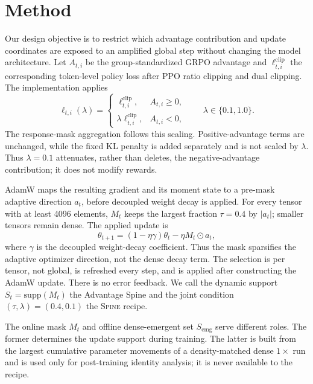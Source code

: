 \documentclass[5p,times]{elsarticle}
\newcommand{\recipe}{\textsc{Spine}}
\newcommand{\Semg}{S_{\mathrm{emg}}}
\newcommand{\St}{S_t}
\begin{document}
\section{Method}\label{sec:method}
Our design objective is to restrict which advantage contribution and update
coordinates are exposed to an amplified global step without changing the model
architecture. Let $A_{t,i}$ be the group-standardized GRPO advantage and
$\ell^{\mathrm{clip}}_{t,i}$ the corresponding token-level policy loss after
PPO ratio clipping and dual clipping. The implementation applies
\begin{equation}
 \ell_{t,i}(\lambda)=
 \begin{cases}
 \ell^{\mathrm{clip}}_{t,i}, & A_{t,i}\geq 0,\\
 \lambda\ell^{\mathrm{clip}}_{t,i}, & A_{t,i}<0,
 \end{cases}
 \qquad \lambda\in\{0.1,1.0\}.
 \label{eq:channel}
\end{equation}
The response-mask aggregation follows this scaling. Positive-advantage terms
are unchanged, while the fixed KL penalty is added separately and is not
scaled by $\lambda$. Thus $\lambda=0.1$ attenuates, rather than deletes, the
negative-advantage contribution; it does not modify rewards.

AdamW maps the resulting gradient and its moment state to a pre-mask adaptive
direction $a_t$, before decoupled weight decay is applied. For
every tensor with at least 4096 elements, $M_t$ keeps the largest fraction
$\tau=0.4$ by $|a_t|$; smaller tensors remain dense. The applied update is
\begin{equation}
 \theta_{t+1}=(1-\eta\gamma)\theta_t-\eta M_t\odot a_t , \label{eq:update}
\end{equation}
where $\gamma$ is the decoupled weight-decay coefficient. Thus the mask
sparsifies the adaptive optimizer direction, not the dense decay term.
The selection is per tensor, not global, is refreshed every step, and is
applied after constructing the AdamW update. There is no error feedback. We
call the dynamic support $\St=\mathrm{supp}(M_t)$ the Advantage Spine and the
joint condition $(\tau,\lambda)=(0.4,0.1)$ the \recipe{} recipe.

The online mask $M_t$ and offline dense-emergent set $\Semg$ serve different
roles. The former determines the update support during training. The latter is
built from the largest cumulative parameter movements of a density-matched
dense $1\times$ run and is used only for post-training identity analysis; it is
never available to the recipe.
\end{document}
